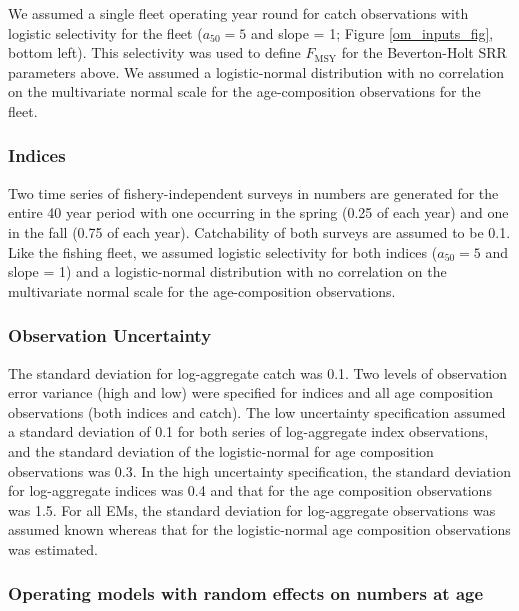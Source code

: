 \documentclass[
  12pt,
]{article}
\newcommand{\Fmsy}{\ensuremath{F_{\text{MSY}}}\xspace}
\begin{document}
We assumed a single fleet operating year round for catch observations
with logistic selectivity for the fleet (\(a_{50} = 5\) and slope = 1;
Figure \ref{om_inputs_fig}, bottom left). This selectivity was used to
define \Fmsy for the Beverton-Holt SRR parameters above. We assumed a
logistic-normal distribution with no correlation on the multivariate
normal scale for the age-composition observations for the fleet.

\hypertarget{indices}{%
\subsubsection*{Indices}\label{indices}}

Two time series of fishery-independent surveys in numbers are generated
for the entire 40 year period with one occurring in the spring (0.25 of
each year) and one in the fall (0.75 of each year). Catchability of both
surveys are assumed to be 0.1. Like the fishing fleet, we assumed
logistic selectivity for both indices (\(a_{50} = 5\) and slope = 1) and
a logistic-normal distribution with no correlation on the multivariate
normal scale for the age-composition observations.

\hypertarget{observation-uncertainty}{%
\subsubsection*{Observation Uncertainty}\label{observation-uncertainty}}

The standard deviation for log-aggregate catch was 0.1. Two levels of
observation error variance (high and low) were specified for indices and
all age composition observations (both indices and catch). The low
uncertainty specification assumed a standard deviation of 0.1 for both
series of log-aggregate index observations, and the standard deviation
of the logistic-normal for age composition observations was 0.3. In the
high uncertainty specification, the standard deviation for log-aggregate
indices was 0.4 and that for the age composition observations was 1.5.
For all EMs, the standard deviation for log-aggregate observations was
assumed known whereas that for the logistic-normal age composition
observations was estimated.

\hypertarget{operating-models-with-random-effects-on-numbers-at-age}{%
\subsubsection*{Operating models with random effects on numbers at
age}\label{operating-models-with-random-effects-on-numbers-at-age}}
\end{document}
